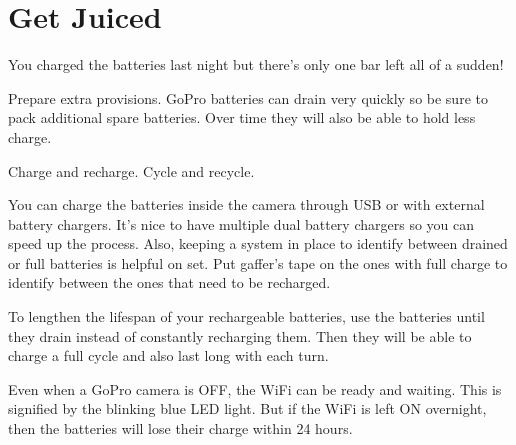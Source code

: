 \section{Get Juiced}
\pagecolor{white}
\label{chap:7}
\begin{fullwidth}

\problem

{\large You charged the batteries last night but there’s only one bar left all of a sudden! \par}

Prepare extra provisions. GoPro batteries can drain very quickly so be sure to pack additional spare batteries. Over time they will also be able to hold less charge. 


\solution

{\large Charge and recharge. Cycle and recycle. \par}

You can charge the batteries inside the camera through USB or with external battery chargers. It’s nice to have multiple dual battery chargers so you can speed up the process. Also, keeping a system in place to identify between drained or full batteries is helpful on set. Put gaffer’s tape on the ones with full charge to identify between the ones that need to be recharged. 

To lengthen the lifespan of your rechargeable batteries, use the batteries until they drain instead of constantly recharging them. Then they will be able to charge a full cycle and also last long with each turn. 

\tip Even when a GoPro camera is OFF, the WiFi can be ready and waiting. This is signified by the blinking blue LED light. But if the WiFi is left ON overnight, then the batteries will lose their charge within 24 hours.




\clearpage
\end{fullwidth}
